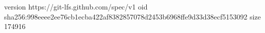 version https://git-lfs.github.com/spec/v1
oid sha256:998eeee2ee76cb1ecba422af8382857078d2453b6968ffe9d33d38ecf5153092
size 174916
